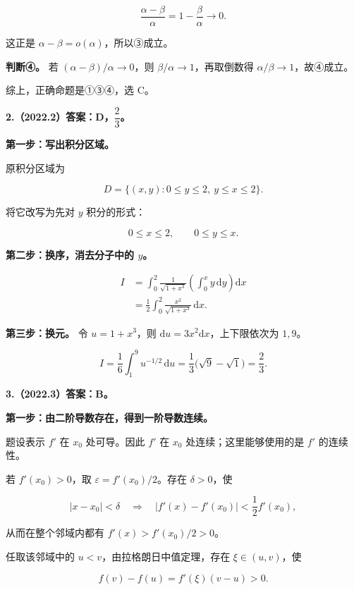 \documentclass[UTF8,11pt,fontset=windows]{ctexart}
\begin{document}
$$
\frac{\alpha-\beta}{\alpha}=1-\frac{\beta}{\alpha}\longrightarrow0.
$$

这正是 $\alpha-\beta=o(\alpha)$，所以③成立。

\textbf{判断④。} 若 $(\alpha-\beta)/\alpha\to0$，则 $\beta/\alpha\to1$，再取倒数得 $\alpha/\beta\to1$，故④成立。

综上，正确命题是①③④，选 C。

\clearpage

\textbf{2.（2022.2）答案：D，$\dfrac23$。}

\textbf{第一步：写出积分区域。}

原积分区域为

$$
D=\{(x,y):0\le y\le2,\ y\le x\le2\}.
$$

将它改写为先对 $y$ 积分的形式：

$$
0\le x\le2,\qquad0\le y\le x.
$$

\textbf{第二步：换序，消去分子中的 $y$。}

$$
\begin{aligned}
I&=\int_0^2\frac1{\sqrt{1+x^3}}\left(\int_0^x y\,\mathrm dy\right)\mathrm dx\\
&=\frac12\int_0^2\frac{x^2}{\sqrt{1+x^3}}\,\mathrm dx.
\end{aligned}
$$

\textbf{第三步：换元。} 令 $u=1+x^3$，则 $\mathrm du=3x^2\mathrm dx$，上下限依次为 $1,9$。

$$
I=\frac16\int_1^9u^{-1/2}\,\mathrm du
=\frac13\bigl(\sqrt9-\sqrt1\bigr)=\frac23.
$$

\clearpage

\textbf{3.（2022.3）答案：B。}

\textbf{第一步：由二阶导数存在，得到一阶导数连续。}

题设表示 $f'$ 在 $x_0$ 处可导。因此 $f'$ 在 $x_0$ 处连续；这里能够使用的是 $f'$ 的连续性。

若 $f'(x_0)>0$，取 $\varepsilon=f'(x_0)/2$。存在 $\delta>0$，使

$$
|x-x_0|<\delta\quad\Longrightarrow\quad
|f'(x)-f'(x_0)|<\frac12f'(x_0),
$$

从而在整个邻域内都有 $f'(x)>f'(x_0)/2>0$。

任取该邻域中的 $u<v$，由拉格朗日中值定理，存在 $\xi\in(u,v)$，使

$$
f(v)-f(u)=f'(\xi)(v-u)>0.
$$
\end{document}
